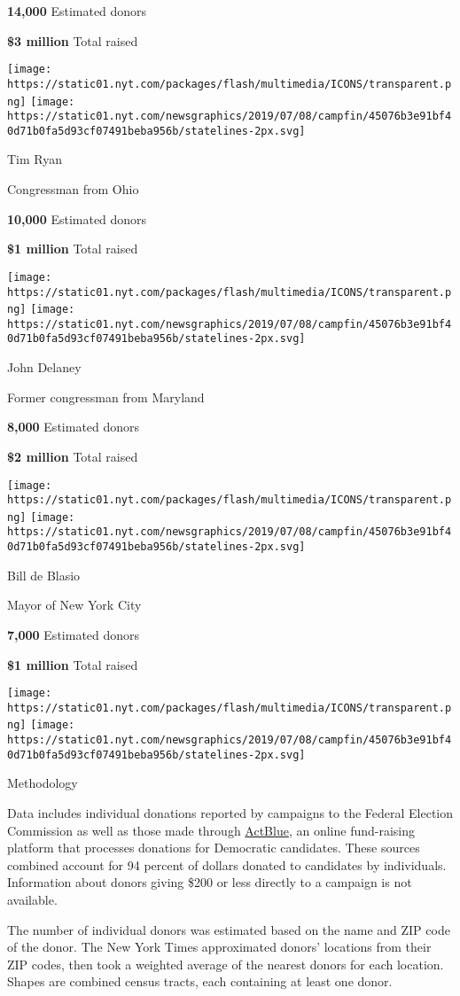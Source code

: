 \textbf{14,000} Estimated donors

\textbf{\$3 million} Total raised

\texttt{[image: https://static01.nyt.com/packages/flash/multimedia/ICONS/transparent.png]}
\texttt{[image: https://static01.nyt.com/newsgraphics/2019/07/08/campfin/45076b3e91bf40d71b0fa5d93cf07491beba956b/statelines-2px.svg]}

Tim Ryan

Congressman from Ohio

\textbf{10,000} Estimated donors

\textbf{\$1 million} Total raised

\texttt{[image: https://static01.nyt.com/packages/flash/multimedia/ICONS/transparent.png]}
\texttt{[image: https://static01.nyt.com/newsgraphics/2019/07/08/campfin/45076b3e91bf40d71b0fa5d93cf07491beba956b/statelines-2px.svg]}

John Delaney

Former congressman from Maryland

\textbf{8,000} Estimated donors

\textbf{\$2 million} Total raised

\texttt{[image: https://static01.nyt.com/packages/flash/multimedia/ICONS/transparent.png]}
\texttt{[image: https://static01.nyt.com/newsgraphics/2019/07/08/campfin/45076b3e91bf40d71b0fa5d93cf07491beba956b/statelines-2px.svg]}

Bill de Blasio

Mayor of New York City

\textbf{7,000} Estimated donors

\textbf{\$1 million} Total raised

\texttt{[image: https://static01.nyt.com/packages/flash/multimedia/ICONS/transparent.png]}
\texttt{[image: https://static01.nyt.com/newsgraphics/2019/07/08/campfin/45076b3e91bf40d71b0fa5d93cf07491beba956b/statelines-2px.svg]}

Methodology

Data includes individual donations reported by campaigns to the Federal
Election Commission as well as those made through
\href{https://www.fec.gov/data/committee/C00401224/}{ActBlue}, an online
fund-raising platform that processes donations for Democratic
candidates. These sources combined account for 94 percent of dollars
donated to candidates by individuals. Information about donors giving
\$200 or less directly to a campaign is not available.

The number of individual donors was estimated based on the name and ZIP
code of the donor. The New York Times approximated donors' locations
from their ZIP codes, then took a weighted average of the nearest donors
for each location. Shapes are combined census tracts, each containing at
least one donor.

